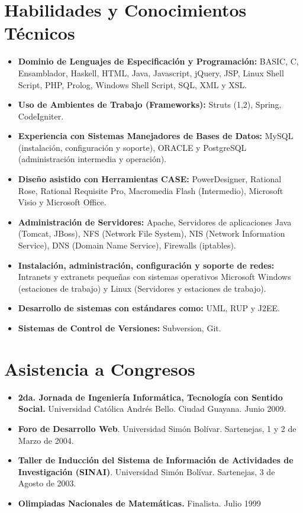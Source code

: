 \documentclass[letterpaper,11pt]{report}
\begin{document}
\section*{Habilidades y Conocimientos Técnicos}
\begin{itemize}
\item
\textbf{Dominio de Lenguajes de Especificación y Programación:} BASIC, C, Ensamblador, Haskell, HTML, Java, Javascript, jQuery, JSP, Linux Shell Script, PHP, Prolog, Windows Shell Script, SQL, XML y XSL.
\item
\textbf{Uso de Ambientes de Trabajo (Frameworks):} Struts (1,2), Spring, CodeIgniter.
\item
\textbf{Experiencia con Sistemas Manejadores de Bases de Datos:} MySQL (instalación, configuración y soporte), ORACLE y PostgreSQL (administración intermedia y operación).
\item
\textbf{Dise\~{n}o asistido con Herramientas CASE:} PowerDesigner, Rational Rose, Rational Requisite Pro, Macromedia Flash (Intermedio), Microsoft Visio y Microsoft Office.
\item
\textbf{Administración de Servidores:} Apache, Servidores de aplicaciones Java (Tomcat, JBoss), NFS (Network File System), NIS (Network Information Service), DNS (Domain Name Service), Firewalls (iptables).
\item
\textbf{Instalación, administración, configuración y soporte de redes:} Intranets y extranets peque\~{n}as con sistemas operativos Microsoft Windows (estaciones de trabajo) y Linux (Servidores y estaciones de trabajo).
\item
\textbf{Desarrollo de sistemas con estándares como:} UML, RUP y J2EE.
\item
\textbf{Sistemas de Control de Versiones:} Subversion, Git.
\end{itemize}

\section*{Asistencia a Congresos}
\begin{itemize}
\item
\textbf{2da. Jornada de Ingeniería Informática, Tecnología con Sentido Social.} Universidad Católica Andrés Bello. Ciudad Guayana. Junio 2009.
\item
\textbf{Foro de Desarrollo Web}. Universidad Simón Bolívar. Sartenejas, 1 y 2 de Marzo de 2004.
\item
\textbf{Taller de Inducción del Sistema de Información de Actividades de Investigación (SINAI)}. Universidad Simón Bolívar. Sartenejas, 3 de Agosto de 2003.
\item
\textbf{Olimpiadas Nacionales de Matemáticas.} Finalista. Julio 1999
\end{itemize}
\end{document}
